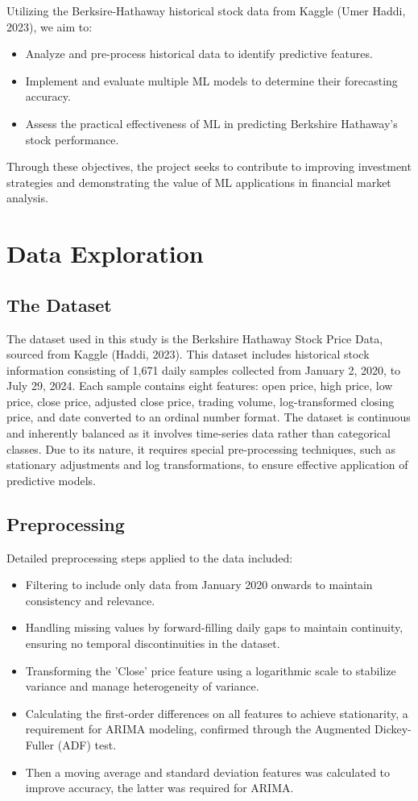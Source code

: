 \documentclass[conference]{IEEEtran}
\begin{document}
Utilizing the Berksire-Hathaway historical stock data from Kaggle (Umer Haddi, 2023), we aim to:
\begin{itemize}
    \item Analyze and pre-process historical data to identify predictive features.
    \item Implement and evaluate multiple ML models to determine their forecasting accuracy.
    \item Assess the practical effectiveness of ML in predicting Berkshire Hathaway’s stock performance.
\end{itemize}

Through these objectives, the project seeks to contribute to improving investment strategies and demonstrating the value of ML applications in financial market analysis.

\section{Data Exploration}

\subsection{The Dataset}

The dataset used in this study is the Berkshire Hathaway Stock Price Data, sourced from Kaggle (Haddi, 2023). This dataset includes historical stock information consisting of 1,671 daily samples collected from January 2, 2020, to July 29, 2024. Each sample contains eight features: open price, high price, low price, close price, adjusted close price, trading volume, log-transformed closing price, and date converted to an ordinal number format. The dataset is continuous and inherently balanced as it involves time-series data rather than categorical classes. Due to its nature, it requires special pre-processing techniques, such as stationary adjustments and log transformations, to ensure effective application of predictive models.

\subsection{Preprocessing}
Detailed preprocessing steps applied to the data included:
\begin{itemize}
    \item Filtering to include only data from January 2020 onwards to maintain consistency and relevance.
    \item Handling missing values by forward-filling daily gaps to maintain continuity, ensuring no temporal discontinuities in the dataset.
    \item Transforming the 'Close' price feature using a logarithmic scale to stabilize variance and manage heterogeneity of variance.
    \item Calculating the first-order differences on all features to achieve stationarity, a requirement for ARIMA modeling, confirmed through the Augmented Dickey-Fuller (ADF) test.
    \item Then a moving average and standard deviation features was calculated to improve accuracy, the latter was required for ARIMA.
\end{itemize}
\end{document}
